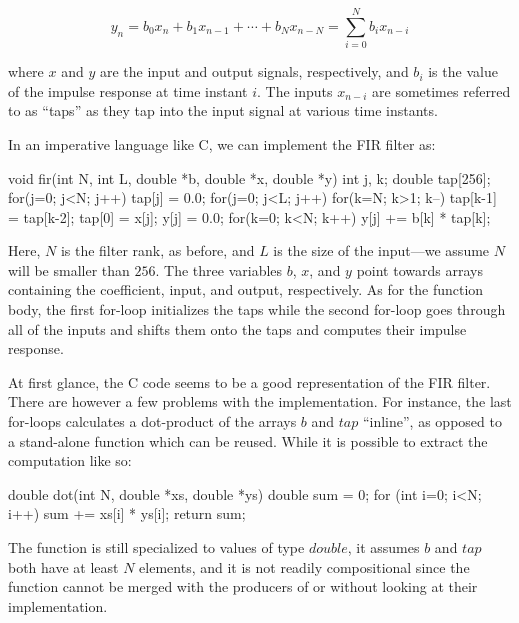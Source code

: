 \documentclass[../paper.tex]{subfiles}
\begin{document}
\begin{equation}
y_{n} = b_{0} x_{n} + b_{1} x_{n-1} + \cdots + b_{N} x_{n-N} = \sum_{i=0}^{N} b_{i} x_{n-i}
\end{equation}
\vspace{1mm}

\noindent where $x$ and $y$ are the input and output signals, respectively, and $b_i$ is the value of the impulse response at time instant $i$. The inputs $x_{n-i}$ are sometimes referred to as ``taps'' as they tap into the input signal at various time instants. 

In an imperative language like C, we can implement the FIR filter as:

\begin{code}
void fir(int N, int L, double *b, double *x, double *y) {
 int j, k;
 double tap[256];
 for(j=0; j<N; j++) tap[j] = 0.0;
 for(j=0; j<L; j++) {
  for(k=N; k>1; k--) tap[k-1] = tap[k-2];
  tap[0] = x[j];
  y[j] = 0.0;
  for(k=0; k<N; k++) y[j] += b[k] * tap[k];
 }
}
\end{code}

\noindent Here, $N$ is the filter rank, as before, and $L$ is the size of the input---we assume $N$ will be smaller than $256$. The three variables $b$, $x$, and $y$ point towards arrays containing the coefficient, input, and output, respectively. As for the function body, the first for-loop initializes the taps while the second for-loop goes through all of the inputs and shifts them onto the taps and computes their impulse response.

At first glance, the C code seems to be a good representation of the FIR filter. There are however a few problems with the implementation. For instance, the last for-loops calculates a dot-product of the arrays $b$ and $tap$ ``inline'', as opposed to a stand-alone function which can be reused. While it is possible to extract the computation like so:


\begin{code}
double dot(int N, double *xs, double *ys) {
  double sum = 0;
  for (int i=0; i<N; i++) sum += xs[i] * ys[i];
  return sum;
}
\end{code}

\noindent The function is still specialized to values of type $double$, it assumes $b$ and $tap$ both have at least $N$ elements, and it is not readily compositional since the function cannot be merged with the producers of  or  without looking at their implementation.
\end{document}
